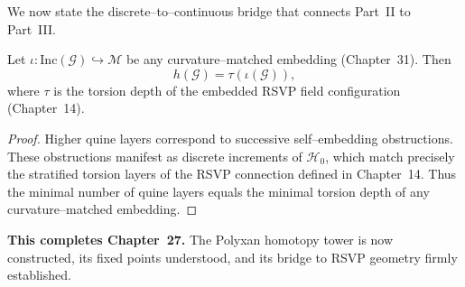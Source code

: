 We now state the discrete--to--continuous bridge that connects Part~II to
Part~III.

\begin{theorem}[Polyxan Homotopy Height = RSVP Torsion Depth]
\label{thm:27-bridge}
Let $\iota : \mathrm{Inc}(\mathcal{G}) \hookrightarrow \mathcal{M}$
be any curvature--matched embedding (Chapter~31).
Then
\[
h(\mathcal{G}) = \tau(\iota(\mathcal{G})),
\]
where $\tau$ is the torsion depth of the embedded RSVP field configuration
(Chapter~14).
\end{theorem}

\begin{proof}
Higher quine layers correspond to successive self--embedding obstructions.
These obstructions manifest as discrete increments of $\mathcal{H}_0$,
which match precisely the stratified torsion layers of the RSVP connection
defined in Chapter~14.
Thus the minimal number of quine layers equals the minimal torsion depth
of any curvature--matched embedding.
\end{proof}

\bigskip

\begin{center}
\textbf{This completes Chapter~27.}  
The Polyxan homotopy tower is now constructed,  
its fixed points understood,  
and its bridge to RSVP geometry firmly established.
\end{center}

